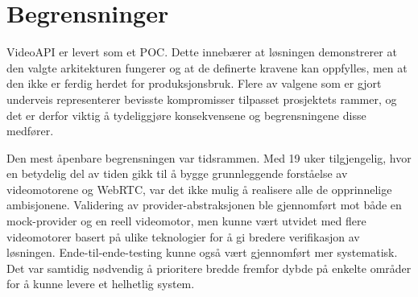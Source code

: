 \section{Begrensninger}
\label{sec:begrensninger}

VideoAPI er levert som et POC. Dette innebærer at løsningen demonstrerer at den valgte arkitekturen fungerer og at de definerte kravene kan oppfylles, men at den ikke er ferdig herdet for produksjonsbruk. Flere av valgene som er gjort underveis representerer bevisste kompromisser tilpasset prosjektets rammer, og det er derfor viktig å tydeliggjøre konsekvensene og begrensningene disse medfører.


Den mest åpenbare begrensningen var tidsrammen. Med 19 uker tilgjengelig, hvor en betydelig del av tiden gikk til å bygge grunnleggende forståelse av videomotorene og WebRTC, var det ikke mulig å realisere alle de opprinnelige ambisjonene. Validering av provider-abstraksjonen ble gjennomført mot både en mock-provider og en reell videomotor, men kunne vært utvidet med flere videomotorer basert på ulike teknologier for å gi bredere verifikasjon av løsningen. Ende-til-ende-testing kunne også vært gjennomført mer systematisk. Det var samtidig nødvendig å prioritere bredde fremfor dybde på enkelte områder for å kunne levere et helhetlig system.


